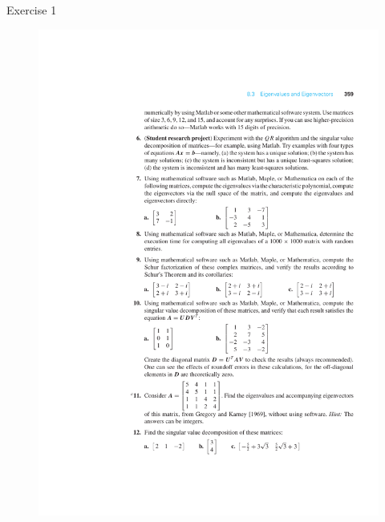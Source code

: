 \documentclass[xcolor=svgnames,t,10pt,allowframebreaks]{beamer}
\begin{document}
\begin{frame}[label={sec:org3b7fe13}]{Exercise 1 \cite{cheney2012numerical}}
\vfill
\begin{figure}[H]

\includegraphics[width=1.0\textwidth]{fig/eigen-exer-02.pdf}
\end{figure}
\vfill
\end{frame}
\begin{frame}[standout,label=]{}
\end{frame}
\end{document}
